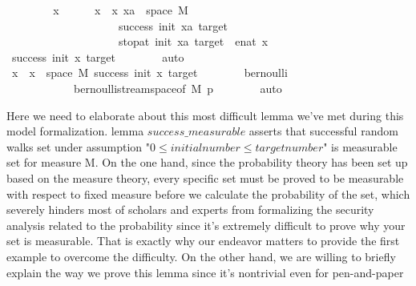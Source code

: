 \begin{isabellebody}
\ \ \isamarkupfalse%
\isanewline
\ \ \ \ \isamarkupfalse%
\ x\isanewline
\ \ \ \ \isamarkupfalse%
\ {\isachardoublequoteopen}x\ {\isasymin}\ {\isacharparenleft}{\kern0pt}{\isasymUnion}x{\isachardot}{\kern0pt}\ {\isacharbraceleft}{\kern0pt}xa\ {\isasymin}\ space\ M{\isachardot}{\kern0pt}\isanewline
\ \ \ \ \ \ \ \ \ \ \ \ \ \ \ \ \ \ \ \ success\ init\ xa\ target\ {\isasymand}\isanewline
\ \ \ \ \ \ \ \ \ \ \ \ \ \ \ \ \ \ \ \ stop{\isacharunderscore}{\kern0pt}at\ init\ xa\ target\ {\isacharequal}{\kern0pt}\ enat\ x{\isacharbraceright}{\kern0pt}{\isacharparenright}{\kern0pt}{\isachardoublequoteclose}\isanewline
\ \ \ \ \isamarkupfalse%
\ \isamarkupfalse%
\ {\isachardoublequoteopen}success\ init\ x\ target{\isachardoublequoteclose}\isanewline
\ \ \ \ \ \ \isamarkupfalse%
\ auto\isanewline
\ \ \ \ \isamarkupfalse%
\ \isamarkupfalse%
\ {\isachardoublequoteopen}x\ {\isasymin}\ {\isacharbraceleft}{\kern0pt}x\ {\isasymin}\ space\ M{\isachardot}{\kern0pt}\ success\ init\ x\ target{\isacharbraceright}{\kern0pt}{\isachardoublequoteclose}\isanewline
\ \ \ \ \ \ \isamarkupfalse%
\ bernoulli\isanewline
\ \ \ \ \ \ \ \ \ \ \ \ bernoulli{\isacharunderscore}{\kern0pt}stream{\isacharunderscore}{\kern0pt}space{\isacharbrackleft}{\kern0pt}of\ M\ p{\isacharbrackright}{\kern0pt}\isanewline
\ \ \ \ \ \ \isamarkupfalse%
\ auto\isanewline
\ \ \isamarkupfalse%
\isanewline
{}\isamarkupfalse%
%
\endisatagproof
{\isafoldproof}%
%
\isadelimproof
%
\endisadelimproof
%
\begin{isamarkuptext}%
Here we need to elaborate about this most difficult lemma we've met during this model 
formalization. lemma $success\_measurable$ asserts that successful random walks set under assumption
"$0 \leq initial number \leq target number$" is measurable set for measure M. On the one hand, since the 
probability theory has been set up based on the measure theory, every specific set must be proved to
be measurable with respect to fixed measure before we calculate the probability of the set, which
severely hinders most of scholars and experts from formalizing the security analysis related to the 
probability since it's extremely difficult to prove why your set is measurable. That is exactly why 
our endeavor matters to provide the first example to overcome the difficulty. On the other hand, we 
are willing to briefly explain the way we prove this lemma since it's nontrivial even for pen-and-paper

\end{isamarkuptext}
\end{isabellebody}
